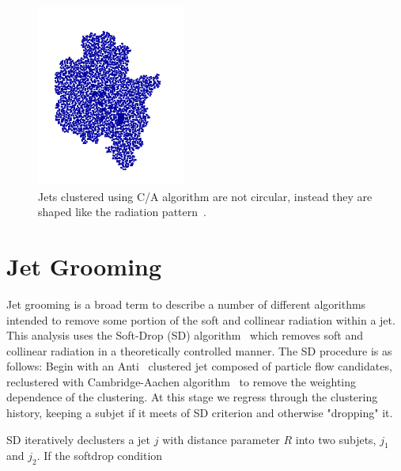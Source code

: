\begin{figure}[htb]
\centering
\includegraphics[width=.40\textwidth]{visuals/figs_subjet-plots-CA.png}
\caption{Jets clustered using C/A algorithm are not circular, instead they are shaped like the radiation pattern~\cite{Dreyer:2018nbf}.}
\label{fig:cashape}
\end{figure}














\section{Jet Grooming}\label{sec:jetgroom}

Jet grooming is a broad term to describe a number of different algorithms intended to remove some portion of the soft and collinear radiation within a jet. This analysis uses the Soft-Drop (SD) algorithm~\cite{softdrop} which removes soft and collinear radiation in a theoretically controlled manner. The SD procedure is as follows: Begin with an Anti\kt ~\cite{Cacciari:2008gp} clustered jet composed of particle flow candidates, reclustered with Cambridge-Aachen algorithm~\cite{Dokshitzer:1997in} to remove the \pt weighting dependence of the clustering. At this stage we regress through the clustering history, keeping a subjet if it meets of SD criterion and otherwise "dropping" it.


SD iteratively declusters a jet $j$ with distance parameter $R$ into two subjets, $j_1$ and $j_2$.
If the softdrop condition

